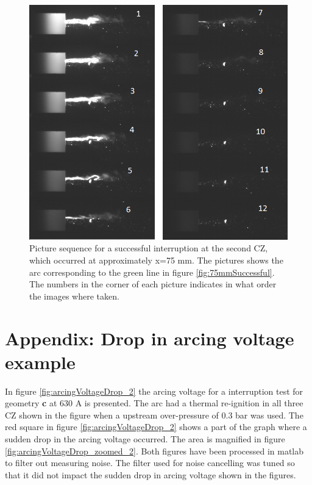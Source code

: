 \documentclass[10pt,b5paper,twoside]{article}
\begin{document}
\begin{figure}[H]
\centering
\includegraphics[scale=0.7, angle =0 ]{Bilder/Results/126_75_TR_OK.png}
\caption{Picture sequence for a successful interruption at the second CZ, which occurred at approximately x=75 mm. The pictures shows the arc corresponding to the green line in figure \ref{fig:75mmSuccessful}. The numbers in the corner of each picture indicates in what order the images where taken.} \label{fig:arcingVoltage_test_114_green_OK}
\end{figure}

\cleardoublepage
\section{Appendix: Drop in arcing voltage example} \label{app:DROP_ImageSequences}
\makeatletter 
\renewcommand{\thefigure}{C.\@arabic\c@figure}
\makeatother

\makeatletter 
\renewcommand{\thetable}{C.\@arabic\c@table}
\makeatother

In figure \ref{fig:arcingVoltageDrop_2} the arcing voltage for a interruption test for geometry \textbf{c} at 630 A is presented. The arc had a thermal re-ignition in all three CZ shown in the figure when a upstream over-pressure of 0.3 bar was used. The red square in figure \ref{fig:arcingVoltageDrop_2} shows a part of the graph where a sudden drop in the arcing voltage occurred. The area is magnified in figure \ref{fig:arcingVoltageDrop_zoomed_2}. Both figures have been processed in matlab to filter out measuring noise. The filter used for noise cancelling was tuned so that it did not impact the sudden drop in arcing voltage shown in the figures.
\end{document}
